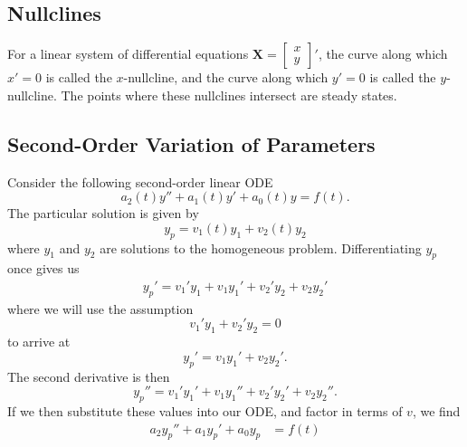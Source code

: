 \documentclass{article}
\begin{document}
\subsection{Nullclines}
For a linear system of differential equations \(\mathbf{X}=\begin{bmatrix}
    x \\ y
\end{bmatrix}'\),
the curve along which \(x'=0\) is called the \(x\)-nullcline,
and the curve along which \(y'=0\) is called the \(y\)-nullcline.
The points where these nullclines intersect are steady states.

\newpage
\begin{appendix}
    \section{Second-Order Variation of Parameters}
    Consider the following second-order linear ODE
    \begin{equation*}
        a_2\left( t \right) y'' + a_1\left( t \right) y' + a_0\left( t \right) y = f\left( t \right).
    \end{equation*}
    The particular solution is given by
    \begin{equation*}
        y_p = v_1 \left( t \right) y_1 + v_2\left( t \right) y_2
    \end{equation*}
    where \(y_1\) and \(y_2\) are solutions to the homogeneous problem.
    Differentiating \(y_p\) once gives us
    \begin{align*}
        y_p' = v_1' y_1 + v_1 y_1' + v_2' y_2 + v_2 y_2'
    \end{align*}
    where we will use the assumption
    \begin{equation*}
        v_1' y_1 + v_2' y_2 = 0
    \end{equation*}
    to arrive at
    \begin{equation*}
        y_p' = v_1 y_1' + v_2 y_2'.
    \end{equation*}
    The second derivative is then
    \begin{equation*}
        y_p'' = v_1' y_1' + v_1 y_1'' + v_2' y_2' + v_2 y_2''.
    \end{equation*}
    If we then substitute these values into our ODE, and factor in terms of \(v\), we find
    \begin{align*}
        a_2 y_p'' + a_1 y_p' + a_0 y_p                                                                                                                   & = f\left( t \right) \\

\end{align*}
\end{appendix}
\end{document}
